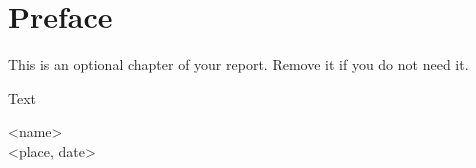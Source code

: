 \chapter*{Preface}

\vskip-10pt
This is an optional chapter of your report. Remove it if you do not need it.

Text

\vskip50pt
<name>\\
<place, date>